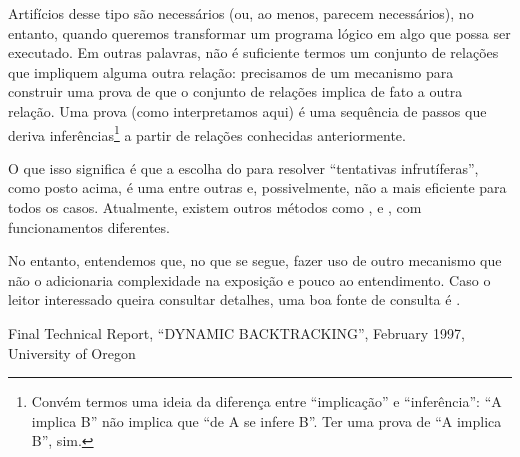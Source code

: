 Artifícios desse tipo são necessários (ou, ao menos, parecem necessários), no entanto, quando
queremos transformar um programa lógico em algo que possa ser executado. Em outras palavras, não é
suficiente termos um conjunto de relações que impliquem alguma outra relação: precisamos de um
mecanismo para construir uma prova de que o conjunto de relações implica de fato a outra relação.
Uma prova (como interpretamos aqui) é uma sequência de passos que deriva inferências\footnote{Convém
  termos uma ideia da diferença entre ``implicação'' e ``inferência'': ``A implica B'' não implica
  que ``de A se infere B''. Ter uma prova de ``A implica B'', sim.} a partir de
relações conhecidas anteriormente.

O que isso significa é que a escolha do  para resolver ``tentativas
infrutíferas'', como posto acima, é uma entre outras e, possivelmente, não a mais eficiente para
todos os casos. Atualmente, existem outros métodos como ,  e , com funcionamentos diferentes.

No entanto, entendemos que, no que se segue, fazer uso de outro mecanismo que não o
 adicionaria complexidade na exposição e pouco  ao
entendimento. Caso o leitor interessado queira consultar detalhes, uma boa fonte de consulta é
\cite{dyn}.



  \begin{thebibliography}{2}

    Final Technical Report,
    ``DYNAMIC BACKTRACKING'',
    February 1997,
    University of Oregon


  \end{thebibliography}

%
